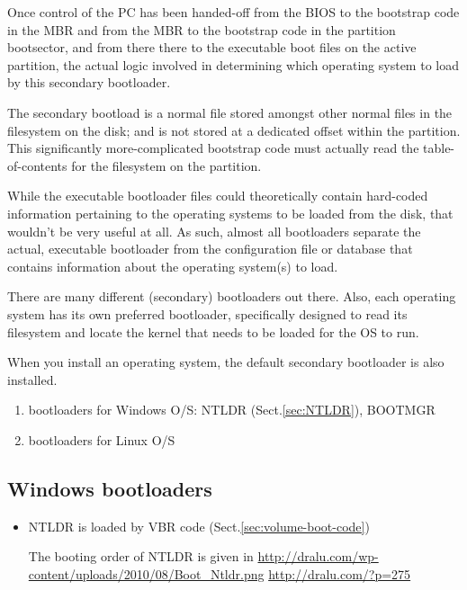 Once control of the PC has been handed-off from the BIOS to the bootstrap code
in the MBR and from the MBR to the bootstrap code in the partition bootsector,
and from there there to the executable boot files on the active partition, the
actual logic involved in determining which operating system to load by this
secondary bootloader. 

The secondary bootload is a normal file stored amongst other normal files in the
filesystem on the disk; and is not stored at a dedicated offset within the
partition. This significantly more-complicated bootstrap code must actually read
the table-of-contents for the filesystem on the partition.


While the executable bootloader files could theoretically contain hard-coded
information pertaining to the operating systems to be loaded from the disk, that
wouldn't be very useful at all. As such, almost all bootloaders separate the
actual, executable bootloader from the configuration file or database that
contains information about the operating system(s) to load.

There are many different (secondary) bootloaders out there. Also, each operating
system has its own preferred bootloader, specifically designed to read its
filesystem and locate the kernel that needs to be loaded for the OS to run.

When you install an operating system, the default secondary bootloader is also
installed.
\begin{enumerate}
  \item bootloaders for Windows O/S: NTLDR (Sect.\ref{sec:NTLDR}), BOOTMGR
  
  \item bootloaders for Linux O/S
\end{enumerate}

\subsection{Windows bootloaders}
\label{sec:bootloader-Windows}

\begin{itemize}
  \item NTLDR is loaded by VBR code (Sect.\ref{sec:volume-boot-code})
  
  The booting order of NTLDR is given in
  \url{http://dralu.com/wp-content/uploads/2010/08/Boot_Ntldr.png}
  \url{http://dralu.com/?p=275}
  
\end{itemize}

